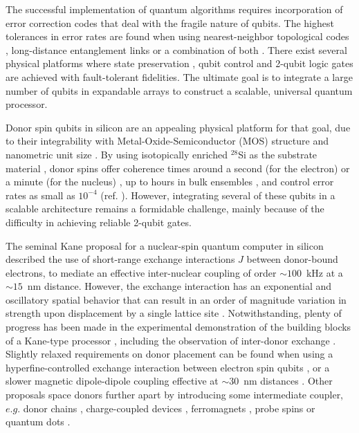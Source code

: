 \documentclass[aps,prb,superscriptaddress,nobibnotes,preprint]{revtex4-1}%
\begin{document}

The successful implementation of quantum algorithms requires incorporation of error correction codes \cite{Terhal2015} that deal with the fragile nature of qubits. The highest tolerances in error rates are found when using nearest-neighbor topological codes \cite{Fowler2012}, long-distance entanglement links \cite{Knill2005} or a combination of both \cite{Nickerson2013}. There exist several physical platforms where state preservation \cite{Maurer2012,Saeedi2013,Muhonen2014}, qubit control \cite{Barends2014,Harty2014,Veldhorst2014,Muhonen2015} and 2-qubit logic gates \cite{Benhelm2008,Barends2014} are achieved with fault-tolerant fidelities. The ultimate goal is to integrate a large number of qubits in expandable arrays to construct a scalable, universal quantum processor.

Donor spin qubits in silicon are an appealing physical platform for that goal, due to their integrability with Metal-Oxide-Semiconductor (MOS) structure and nanometric unit size \cite{Zwanenburg2013}. By using isotopically enriched $^{28}$Si as the substrate material \cite{Itoh2014}, donor spins offer coherence times around a second (for the electron) or a minute (for the nucleus) \cite{Muhonen2014}, up to hours in bulk ensembles \cite{Saeedi2013}, and control error rates as small as $10^{-4}$ (ref. ). However, integrating several of these qubits in a scalable architecture remains a formidable challenge, mainly because of the difficulty in achieving reliable 2-qubit gates.

The seminal Kane proposal \cite{Kane1998} for a nuclear-spin quantum computer in silicon described the use of short-range exchange interactions $J$ between donor-bound electrons, to mediate an effective inter-nuclear coupling of order $\sim 100$~kHz at a $\sim 15$~nm distance. However, the exchange interaction has an exponential and oscillatory spatial behavior that can result in an order of magnitude variation in strength upon displacement by a single lattice site \cite{Koiller2002,Song2016}. Notwithstanding, plenty of progress has been made in the experimental demonstration of the building blocks of a Kane-type processor \cite{Morello2010,Pla2012,Pla2013,Laucht2015}, including the observation of inter-donor exchange \cite{Dehollain2014,Gonzalez2014,Weber2014}. Slightly relaxed requirements on donor placement can be found when using a hyperfine-controlled exchange interaction between electron spin qubits \cite{Kalra2014}, or a slower magnetic dipole-dipole coupling effective at $\sim 30$~nm distances \cite{Hill2015}. Other proposals space donors further apart by introducing some intermediate coupler, $e.g.$ donor chains \cite{Hollenberg2006,Mohiyaddin2016}, charge-coupled devices \cite{Morton2009}, ferromagnets \cite{Trifunovic2013}, probe spins \cite{Ogorman2014} or quantum dots \cite{Pica2015}.
\end{document}
